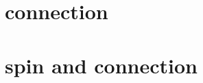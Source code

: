 \documentclass[dvipdfmx]{jsarticle}
\begin{document}
\section{connection}


\section{spin and connection}

\end{document}
